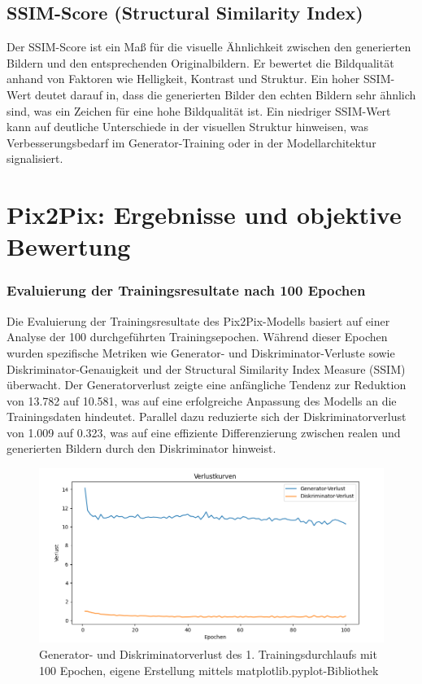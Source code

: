 \subsection{SSIM-Score (Structural Similarity Index)}
Der SSIM-Score ist ein Maß für die visuelle Ähnlichkeit zwischen den generierten Bildern und den entsprechenden Originalbildern. Er bewertet die Bildqualität anhand von Faktoren wie Helligkeit, Kontrast und Struktur. Ein hoher SSIM-Wert deutet darauf in, dass die generierten Bilder den echten Bildern sehr ähnlich sind, was ein Zeichen für eine hohe Bildqualität ist. Ein niedriger SSIM-Wert kann auf deutliche Unterschiede in der visuellen Struktur hinweisen, was Verbesserungsbedarf im Generator-Training oder in der Modellarchitektur signalisiert.

\section{Pix2Pix: Ergebnisse und objektive Bewertung}
\subsubsection{Evaluierung der Trainingsresultate nach 100 Epochen}
Die Evaluierung der Trainingsresultate des Pix2Pix-Modells basiert auf einer Analyse der 100 durchgeführten Trainingsepochen. Während dieser Epochen wurden spezifische Metriken wie Generator- und Diskriminator-Verluste sowie Diskriminator-Genauigkeit und der Structural Similarity Index Measure (SSIM) überwacht. \newline
Der Generatorverlust zeigte eine anfängliche Tendenz zur Reduktion von 13.782 auf 10.581, was auf eine erfolgreiche Anpassung des Modells an die Trainingsdaten hindeutet. Parallel dazu reduzierte sich der Diskriminatorverlust von 1.009 auf 0.323, was auf eine effiziente Differenzierung zwischen realen und generierten Bildern durch den Diskriminator hinweist.
\begin{figure}[h]
	\centering
	\includegraphics[width=1.0\textwidth]{images/Pix2PixResults/Verlust0-100.png}
	\caption{Generator- und Diskriminatorverlust des 1. Trainingsdurchlaufs mit 100 Epochen, eigene Erstellung mittels matplotlib.pyplot-Bibliothek }
	\label{fig:Verlustkurve 0-100}
\end{figure}

